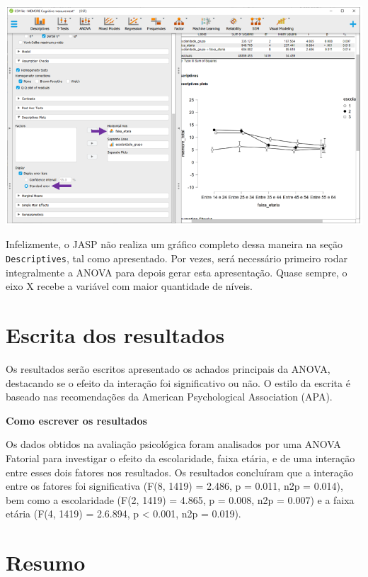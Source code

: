 \documentclass[
]{book}
\begin{document}
\includegraphics{./img/cap_anova_fatorial_descriptives_final.png}

Infelizmente, o JASP não realiza um gráfico completo dessa maneira na seção \texttt{Descriptives}, tal como apresentado. Por vezes, será necessário primeiro rodar integralmente a ANOVA para depois gerar esta apresentação. Quase sempre, o eixo X recebe a variável com maior quantidade de níveis.

\hypertarget{escrita-dos-resultados-7}{%
\section{Escrita dos resultados}\label{escrita-dos-resultados-7}}

Os resultados serão escritos apresentado os achados principais da ANOVA, destacando se o efeito da interação foi significativo ou não. O estilo da escrita é baseado nas recomendações da American Psychological Association (APA).

\begin{writing}
\textbf{Como escrever os resultados}

Os dados obtidos na avaliação psicológica foram analisados por uma ANOVA
Fatorial para investigar o efeito da escolaridade, faixa etária, e de
uma interação entre esses dois fatores nos resultados. Os resultados
concluíram que a interação entre os fatores foi significativa (F(8,
1419) = 2.486, p = 0.011, n2p = 0.014), bem como a escolaridade (F(2,
1419) = 4.865, p = 0.008, n2p = 0.007) e a faixa etária (F(4, 1419) =
2.6.894, p \textless{} 0.001, n2p = 0.019).
\end{writing}

\hypertarget{resumo-8}{%
\section{Resumo}\label{resumo-8}}
\end{document}
